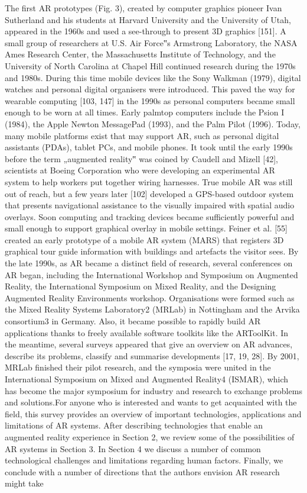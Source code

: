 The first AR prototypes (Fig. 3), created by computer
graphics pioneer Ivan Sutherland and his students at Harvard
University and the University of Utah, appeared in the 1960s
and used a see-through to present 3D graphics [151].
A small group of researchers at U.S. Air Force‟s Armstrong
Laboratory, the NASA Ames Research Center, the
Massachusetts Institute of Technology, and the University of
North Carolina at Chapel Hill continued research during the
1970s and 1980s. During this time mobile devices like the
Sony Walkman (1979), digital watches and personal digital
organisers were introduced. This paved the way for wearable
computing [103, 147] in the 1990s as personal computers
became small enough to be worn at all times. Early palmtop
computers include the Psion I (1984), the Apple Newton
MessagePad (1993), and the Palm Pilot (1996). Today, many mobile platforms exist that may support AR, such as personal
digital assistants (PDAs), tablet PCs, and mobile phones.
It took until the early 1990s before the term „augmented
reality‟ was coined by Caudell and Mizell [42], scientists at
Boeing Corporation who were developing an experimental
AR system to help workers put together wiring harnesses.
True mobile AR was still out of reach, but a few years later
[102] developed a GPS-based outdoor system that presents
navigational assistance to the visually impaired with spatial
audio overlays. Soon computing and tracking devices became
sufficiently powerful and small enough to support
graphical overlay in mobile settings. Feiner et al. [55] created
an early prototype of a mobile AR system (MARS) that
registers 3D graphical tour guide information with buildings
and artefacts the visitor sees. By the late 1990s, as AR became a distinct field of research,
several conferences on AR began, including the International
Workshop and Symposium on Augmented Reality,
the International Symposium on Mixed Reality, and the
Designing Augmented Reality Environments workshop.
Organisations were formed such as the Mixed Reality Systems
Laboratory2 (MRLab) in Nottingham and the Arvika
consortium3 in Germany. Also, it became possible to rapidly
build AR applications thanks to freely available software
toolkits like the ARToolKit. In the meantime, several surveys
appeared that give an overview on AR advances, describe its
problems, classify and summarise developments [17, 19, 28].
By 2001, MRLab finished their pilot research, and the
symposia were united in the International Symposium on
Mixed and Augmented Reality4 (ISMAR), which has become
the major symposium for industry and research to exchange
problems and solutions.For anyone who is interested and wants to get acquainted
with the field, this survey provides an overview of important
technologies, applications and limitations of AR systems.
After describing technologies that enable an augmented reality
experience in Section 2, we review some of the possibilities
of AR systems in Section 3. In Section 4 we discuss a
number of common technological challenges and limitations
regarding human factors. Finally, we conclude with a number
of directions that the authors envision AR research might
take


